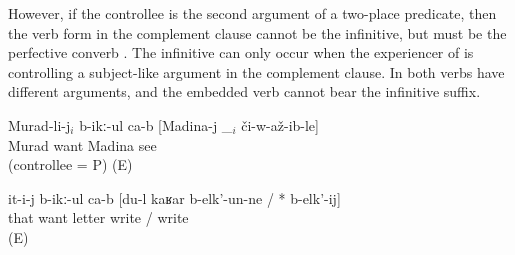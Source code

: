 However, if the controllee is the second argument of a two-place predicate, then the verb form in the complement clause cannot be the infinitive, but must be the perfective converb . The infinitive can only occur when the experiencer of  is controlling a subject-like argument in the complement clause. In  both verbs have different arguments, and the embedded verb cannot bear the infinitive suffix.
%
\begin{exe}
	\ex	\label{ex:Murad, Madina, letter@45}
	\begin{xlist}
		\ex	\label{ex:Murad wants Madina to see him@45a}
		\gll	Murad-li-j$_{i}$	b-ikː-ul ca-b	[Madina-j	\_$_{i}$	či-w-až-ib-le]\\
			Murad	want 	 Madina		see\\
		\glt	{} (controllee = P) (E)

		\ex	\label{ex:He wants that I write the letter@45b}
		\gll	it-i-j	b-ikː-ul ca-b	[du-l	kaʁar 	b-elk'-un-ne	/ 	{*}	b-elk'-ij]\\
			that	want 		letter	write	/	{} write\\
		\glt	{} (E)
	\end{xlist}
\end{exe}

